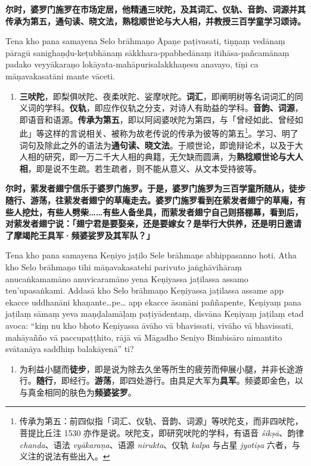 \textbf{尔时，婆罗门施罗在市场定居，他精通三吠陀，及其词汇、仪轨、音韵、词源并其传承为第五，通句读、晓文法，熟稔顺世论与大人相，并教授三百学童学习颂诗。}

Tena kho pana samayena Selo brāhmaṇo Āpaṇe paṭivasati, tiṇṇaṃ vedānaṃ pāragū sanighaṇḍu-keṭubhānaṃ sākkhara-ppabhedānaṃ itihāsa-pañcamānaṃ padako veyyākaraṇo lokāyata-mahāpurisalakkhaṇesu anavayo, tīṇi ca māṇavakasatāni mante vāceti.

\begin{enumerate}\item \textbf{三吠陀}，即梨俱吠陀、夜柔吠陀、娑摩吠陀。\textbf{词汇}，即阐明树等名词词汇的同义词的学科。\textbf{仪轨}，即应作仪轨之分支，对诗人有助益的学科。\textbf{音韵、词源}，即语音和语源。\textbf{传承为第五}，即以阿闼婆吠陀为第四，与「曾经如此、曾经如此」等这样的言说相关、被称为故老传说的传承为彼等的第五\footnote{传承为第五：前四似指「词汇、仪轨、音韵、词源」等吠陀支，而非四吠陀，菩提比丘注 1530 亦作是说。吠陀支，即研究吠陀的学科，有语音 \textit{śikṣā}、韵律 \textit{chanda}、语法 \textit{vyākaraṇa}、语源 \textit{nirukta}、仪轨 \textit{kalpa} 与占星 \textit{jyotiṣa} 六者，与义注的说法有些出入。}。学习、明了词句及除此之外的语法为\textbf{通句读、晓文法}。于顺世论，即诡辩论术，以及于大人相的研究，即一万二千大人相的典籍，无欠缺而圆满，为\textbf{熟稔顺世论与大人相}，即是说不生疏。若生疏者，则不能从意义、从文本受持彼等。\end{enumerate}

\textbf{尔时，萦发者翅宁信乐于婆罗门施罗。于是，婆罗门施罗为三百学童所随从，徒步随行、游荡，往萦发者翅宁的草庵走去。婆罗门施罗看到在萦发者翅宁的草庵，有些人挖灶，有些人劈柴……有些人备坐具，而萦发者翅宁自己则搭棚幕，看到后，对萦发者翅宁说：「翅宁君是要娶亲，还是要嫁女？是举行大供养，还是明日邀请了摩竭陀王具军·频婆娑罗及其军队？」}

Tena kho pana samayena Keṇiyo jaṭilo Sele brāhmaṇe abhippasanno hoti. Atha kho Selo brāhmaṇo tīhi māṇavakasatehi parivuto jaṅghāvihāraṃ anucaṅkamamāno anuvicaramāno yena Keṇiyassa jaṭilassa assamo ten’upasaṅkami. Addasā kho Selo brāhmaṇo Keṇiyassa jaṭilassa assame app ekacce uddhanāni khaṇante…pe… app ekacce āsanāni paññapente, Keṇiyaṃ pana jaṭilaṃ sāmaṃ yeva maṇḍalamāḷaṃ paṭiyādentaṃ, disvāna Keṇiyaṃ jaṭilaṃ etad avoca: “kiṃ nu kho bhoto Keṇiyassa āvāho vā bhavissati, vivāho vā bhavissati, mahāyañño vā paccupaṭṭhito, rājā vā Māgadho Seniyo Bimbisāro nimantito svātanāya saddhiṃ balakāyenā” ti?

\begin{enumerate}\item 为利益小腿而\textbf{徒步}，即是说为除去久坐等所生的疲劳而伸展小腿，并非长途游行。\textbf{随行}，即经行。\textbf{游荡}，即四处游行。由具足大军为\textbf{具军}。频婆即金色，以与真金相同的肤色为\textbf{频婆娑罗}。\end{enumerate}

